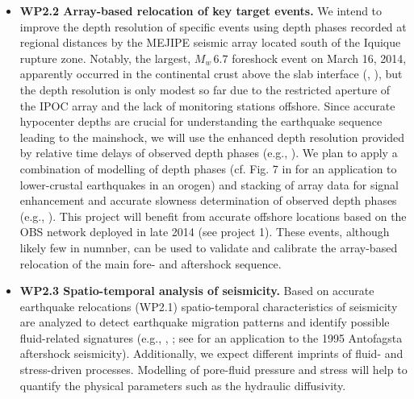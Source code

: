 \documentclass[11pt]{article}
\newcommand{\note}[1]{{\it \color{red} #1}}
\newcommand{\note}[1]{}
\begin{document}
\begin{itemize}
\item
{\bf WP2.2 
Array-based relocation of key target events.}
We intend to improve the depth resolution of specific events using depth phases recorded at regional distances by the MEJIPE seismic array located south of the Iquique rupture zone.
Notably, the largest, $M_w\,6.7$ foreshock event on March 16, 2014, apparently occurred in the continental crust above the slab interface (\cite{schurr2014}, \cite{hayes2014}), but the depth resolution is only modest so far due to the restricted  aperture of the IPOC array and the lack of monitoring stations offshore.
Since accurate hypocenter depths are crucial for understanding the earthquake sequence leading to the mainshock, we will use the enhanced depth resolution provided by relative time delays of observed depth phases (e.g., \cite{zonno:1984}).
We plan to apply a combination of modelling of depth phases (cf. Fig. 7 in \cite{kummerow2004} for an application to lower-crustal earthquakes in an orogen) and stacking of array data for signal enhancement and accurate slowness determination of observed depth phases (e.g., \cite{Rost2002}).
This project will benefit from accurate offshore locations based on the OBS network deployed in late 2014 (see project 1). These events, although likely few in numnber, can be used to validate and calibrate the array-based relocation of the main fore- and aftershock sequence.

\item
{\bf WP2.3 Spatio-temporal analysis of seismicity.}
Based on accurate earthquake relocations (WP2.1) spatio-temporal characteristics of seismicity are analyzed to detect earthquake migration patterns and identify possible fluid-related signatures (e.g., \cite{shapiro:1997}, \cite{shapiro:2002}; see \cite{shapiro:2003} for an application to the 1995 Antofagsta aftershock seismicity).
Additionally, we expect different imprints of fluid- and stress-driven processes. Modelling of pore-fluid pressure and stress will help to quantify the physical parameters such as the hydraulic diffusivity.   


\end{itemize}
\end{document}
